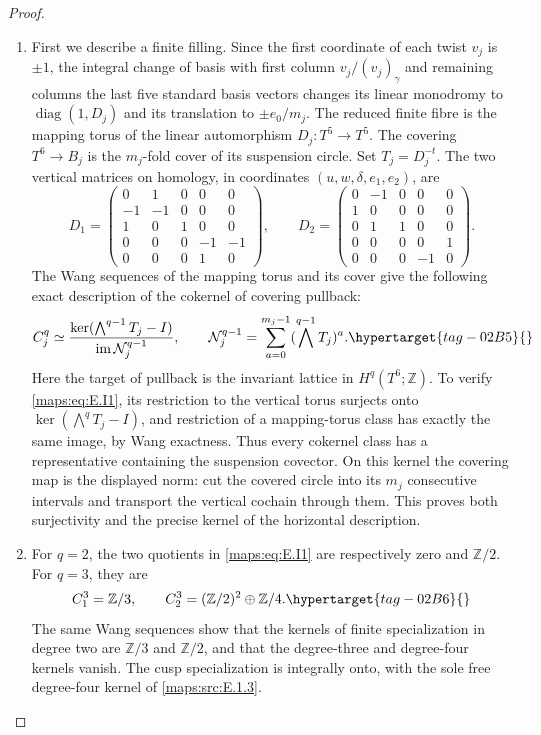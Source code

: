 \documentclass[11pt,a4paper]{article}
\numberwithin{equation}{section}
\theoremstyle{definition}
\begin{document}
\begin{proof}
\begin{enumerate}[label=\arabic*.,leftmargin=*]
\item First we describe a finite filling. Since the first coordinate of each twist
\(v_j\) is \(\pm1\), the integral change of basis with first
column \(v_j/(v_j)_\gamma\) and remaining columns the last five
standard basis vectors changes its linear monodromy to
\(\operatorname{diag}(1,D_j)\) and its translation to
\(\pm e_0/m_j\). The reduced finite fibre is the mapping torus
of the linear automorphism \(D_j:T^5\to T^5\).
The covering \(T^6\to B_j\) is the \(m_j\)-fold cover of its
suspension circle. Set \(T_j=D_j^{-t}\). The two vertical matrices
on homology, in coordinates \((u,w,\delta,e_1,e_2)\), are
\[
D_1=\begin{pmatrix}
0&1&0&0&0\\-1&-1&0&0&0\\1&0&1&0&0\\
0&0&0&-1&-1\\0&0&0&1&0
\end{pmatrix},\qquad
D_2=\begin{pmatrix}
0&-1&0&0&0\\1&0&0&0&0\\0&1&1&0&0\\
0&0&0&0&1\\0&0&0&-1&0
\end{pmatrix}.
\]
The Wang sequences of the mapping torus and its cover give the
following exact description of the cokernel of covering pullback:
\begin{equation}
 C_j^q\simeq
 \frac{\ker(\bigwedge^{q-1}T_j-I)}
 {\operatorname{im}\mathcal N_j^{q-1}},\qquad
 \mathcal N_j^{q-1}=\sum_{a=0}^{m_j-1}
                  (\bigwedge^{q-1}T_j)^a .
 \hypertarget{tag-02B5}{}\label{maps:eq:E.I1}
\end{equation}
Here the target of pullback is the invariant lattice in
\(H^q(T^6;\mathbb Z)\). To verify \eqref{maps:eq:E.I1}, its restriction to
the vertical torus surjects onto
\(\ker(\bigwedge^qT_j-I)\), and restriction of a mapping-torus
class has exactly the same image, by Wang exactness. Thus every
cokernel class has a representative containing the suspension
covector. On this kernel the covering map is the displayed norm:
cut the covered circle into its \(m_j\) consecutive intervals
and transport the vertical cochain through them. This proves both
surjectivity and the precise kernel of the horizontal description.


\item For \(q=2\), the two quotients in \eqref{maps:eq:E.I1} are respectively zero
and \(\mathbb Z/2\). For \(q=3\), they are
\begin{equation}
 C_1^3=\mathbb Z/3,\qquad
 C_2^3=(\mathbb Z/2)^2\oplus\mathbb Z/4.
 \hypertarget{tag-02B6}{}\label{maps:eq:E.I2}
\end{equation}
The same Wang sequences show that the kernels of finite
specialization in degree two are \(\mathbb Z/3\) and
\(\mathbb Z/2\), and that the degree-three and degree-four
kernels vanish. The cusp specialization is integrally onto,
with the sole free degree-four kernel of \ref{maps:src:E.1.3}.


\end{enumerate}
\end{proof}
\end{document}
